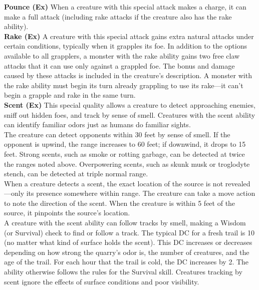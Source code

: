 \textbf{Pounce (Ex)} When a creature with this special attack makes a charge, it can make a full attack (including rake attacks if the creature also has the rake ability). \\

\textbf{Rake (Ex)} A creature with this special attack gains extra natural attacks under certain conditions, typically when it grapples its foe. In addition to the options available to all grapplers, a monster with the rake ability gains two free claw attacks that it can use only against a grappled foe. The bonus and damage caused by these attacks is included in the creature’s description. A monster with the rake ability must begin its turn already grappling to use its rake—it can’t begin a grapple and rake in the same turn. \\

\textbf{Scent (Ex)} This special quality allows a creature to detect approaching enemies, sniff out hidden foes, and track by sense of smell. Creatures with the scent ability can identify familiar odors just as humans do familiar sights. \\

The creature can detect opponents within 30 feet by sense of smell. If the opponent is upwind, the range increases to 60 feet; if downwind, it drops to 15 feet. Strong scents, such as smoke or rotting garbage, can be detected at twice the ranges noted above. Overpowering scents, such as skunk musk or troglodyte stench, can be detected at triple normal range. \\

When a creature detects a scent, the exact location of the source is not revealed—only its presence somewhere within range. The creature can take a move action to note the direction of the scent. When the creature is within 5 feet of the source, it pinpoints the source's location. \\

A creature with the scent ability can follow tracks by smell, making a Wisdom (or Survival) check to find or follow a track. The typical DC for a fresh trail is 10 (no matter what kind of surface holds the scent). This DC increases or decreases depending on how strong the quarry's odor is, the number of creatures, and the age of the trail. For each hour that the trail is cold, the DC increases by 2. The ability otherwise follows the rules for the Survival skill. Creatures tracking by scent ignore the effects of surface conditions and poor visibility. \\

\newpage
